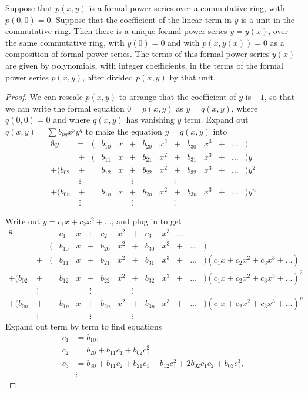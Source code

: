 \begin{theorem}\label{thm:formal.solve}
Suppose that \(p(x,y)\) is a formal power series over a commutative ring, with \(p(0,0)=0\).
Suppose that the coefficient of the linear term in \(y\) is a unit in the commutative ring.
Then there is a unique formal power series \(y=y(x)\), over the same commutative ring, with \(y(0)=0\) and with \(p(x,y(x))=0\) as a composition of formal power series.
The terms of this formal power series \(y(x)\) are given by polynomials, with integer coefficients, in the terms of the formal power series \(p(x,y)\), after divided \(p(x,y)\) by that unit.
\end{theorem}
\begin{proof}
We can rescale \(p(x,y)\) to arrange that the coefficient of \(y\) is \(-1\), so that we can write the formal equation \(0=p(x,y)\)  as \(y=q(x,y)\), where \(q(0,0)=0\) and where \(q(x,y)\) has vanishing \(y\) term.
Expand out \(q(x,y)=\sum b_{pq} x^py^q\) to make the equation \(y=q(x,y)\) into
\begin{alignat*}{8}
y&=&(&b_{10}&x&+&b_{20}&x^2&+&b_{30}&x^3&+&\dots&)\\
&\,+&(&b_{11}&x&+&b_{21}&x^2&+&b_{31}&x^3&+&\dots&)y\\
+(b_{02}&\,+&&b_{12}&x&+&b_{22}&x^2&+&b_{32}&x^3&+&\dots&)y^2\\
&\ \vdots&&&&\ \vdots&&&\vdots\\
+(b_{0n}&\,+&&b_{1n}&x&+&b_{2n}&x^2&+&b_{3n}&x^3&+&\dots&)y^n\\
&\ \vdots&&&&\ \vdots&&&\vdots
\end{alignat*}

Write out \(y=c_1x+c_2x^2+\dots\), and plug in to get
\begin{alignat*}{8}
&&&c_1&x&+&c_2&x^2&+&c_3&x^3&\dots\\
&=&(&b_{10}&x&+&b_{20}&x^2&+&b_{30}&x^3&+&\dots&)\\
&\,+&(&b_{11}&x&+&b_{21}&x^2&+&b_{31}&x^3&+&\dots&)(c_1x+c_2x^2+c_3x^3+\dots)\\
+(b_{02}&\,+&&b_{12}&x&+&b_{22}&x^2&+&b_{32}&x^3&+&\dots&)(c_1x+c_2x^2+c_3x^3+\dots)^2\\
&\ \vdots&&&&\ \vdots&&&\vdots\\
+(b_{0n}&\,+&&b_{1n}&x&+&b_{2n}&x^2&+&b_{3n}&x^3&+&\dots&)(c_1x+c_2x^2+c_3x^3+\dots)^n\\
&\ \vdots&&&&\ \vdots&&&\vdots
\end{alignat*}
Expand out term by term to find equations
\begin{align*}
c_1&=b_{10},\\
c_2&=b_{20}+b_{11}c_1+b_{02}c_1^2\\
c_3&=b_{30}+b_{11}c_2+b_{21}c_1+b_{12}c_1^2+2b_{02}c_1c_2+b_{03}c_1^3,\\
      &\vdots
\end{align*}


\end{proof}
